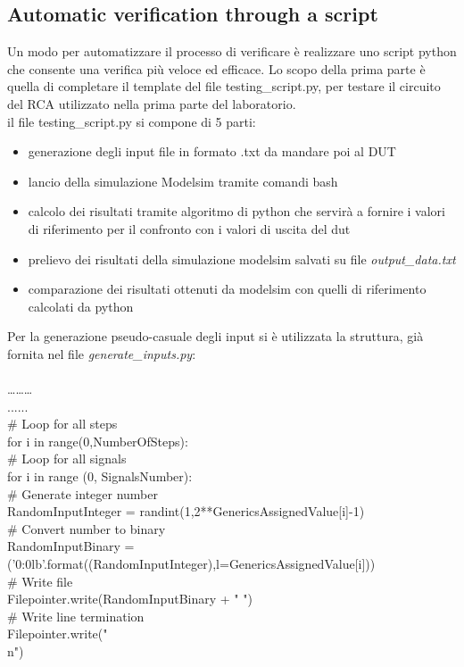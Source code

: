 \subsection{Automatic verification through a script}
Un modo per automatizzare il processo di verificare è realizzare uno script python che consente una verifica più veloce ed efficace. Lo scopo della prima parte è quella di completare il template del file testing\_script.py, per testare il circuito del RCA utilizzato nella prima parte del laboratorio.\\
il file testing\_script.py  si compone di 5 parti:
\begin{itemize}
	\item{generazione degli input file in formato .txt da mandare poi al DUT}
	\item{lancio della simulazione Modelsim tramite comandi bash}
	\item{calcolo dei risultati tramite algoritmo di python che servirà a fornire i valori di riferimento per il confronto con i valori  di uscita del dut}
	\item{prelievo dei risultati della simulazione modelsim salvati su file \textit{output\_data.txt}}
	\item{comparazione dei risultati ottenuti da modelsim con quelli di riferimento calcolati da python}
\end{itemize}
Per la generazione pseudo-casuale degli input si è utilizzata la struttura, già fornita nel file \textit{generate\_inputs.py}:\\
\\
………\\
......\\
\# Loop for all steps\\
for i in range(0,NumberOfSteps):\\
\# Loop for all signals\\
for i in range (0, SignalsNumber):\\
\# Generate integer number\\
RandomInputInteger = randint(1,2**GenericsAssignedValue[i]-1)\\
\# Convert number to binary\\
RandomInputBinary = ('{0:0{l}b}'.format((RandomInputInteger),l=GenericsAssignedValue[i]))\\
\# Write file\\
Filepointer.write(RandomInputBinary + " ")\\
\# Write line termination\\
Filepointer.write("\\n")\\
